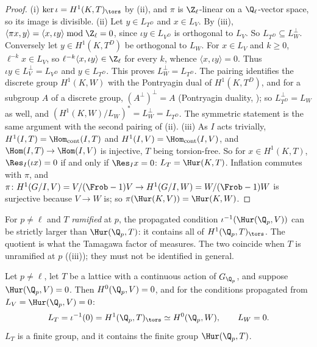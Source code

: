 \begin{proof}
(i) $\ker\iota=H^1(K,T)_{\tors}$ by (ii), and $\pi$ is $\Z_\ell$-linear on a $\Q_\ell$-vector space, so its image is divisible.
(ii) Let $y\in L_{T^D}$ and $x\in L_V$. By (iii), $\langle\pi x,y\rangle=\langle x,\iota y\rangle\bmod\Z_\ell=0$, since $\iota y\in L_{V^D}$ is orthogonal
to $L_V$. So $L_{T^D}\subseteq L_W^\perp$. Conversely let $y\in H^1(K,T^D)$ be orthogonal to $L_W$. For $x\in L_V$ and $k\ge0$, $\ell^{-k}x\in L_V$, so
$\ell^{-k}\langle x,\iota y\rangle\in\Z_\ell$ for every $k$, whence $\langle x,\iota y\rangle=0$. Thus $\iota y\in L_V^\perp=L_{V^D}$ and $y\in L_{T^D}$. This proves
$L_W^\perp=L_{T^D}$. The pairing identifies the discrete group $H^1(K,W)$ with the Pontryagin dual of $H^1(K,T^D)$, and for a subgroup $A$ of a discrete group,
$(A^\perp)^\perp=A$ (Pontryagin duality, ); so $L_{T^D}^\perp=L_W$ as well, and $(H^1(K,W)/L_W)^*=L_W^\perp=L_{T^D}$. The symmetric statement is the same
argument with the second pairing of (ii).
(iii) As $I$ acts trivially, $H^1(I,T)=\Hom_{\mathrm{cont}}(I,T)$ and $H^1(I,V)=\Hom_{\mathrm{cont}}(I,V)$, and $\Hom(I,T)\to\Hom(I,V)$ is injective, $T$ being torsion-free. So
for $x\in H^1(K,T)$, $\Res_I(\iota x)=0$ if and only if $\Res_Ix=0$: $L_T=\Hur(K,T)$. Inflation commutes with $\pi$, and $\pi\colon H^1(G/I,V)=V/(\Frob-1)V\to
H^1(G/I,W)=W/(\Frob-1)W$ is surjective because $V\to W$ is; so $\pi(\Hur(K,V))=\Hur(K,W)$.
\end{proof}

\begin{warning}
For $p\ne\ell$ and $T$ \emph{ramified} at $p$, the propagated condition $\iota^{-1}(\Hur(\Q_p,V))$ can be strictly larger than $\Hur(\Q_p,T)$: it contains all of
$H^1(\Q_p,T)_{\tors}$. The quotient is what the Tamagawa factor of  measures. The two coincide when $T$ is unramified at $p$
((iii)); they must not be identified in general.
\end{warning}

\begin{corollary}\label{cor:galcoh:ur-vanishing}
Let $p\ne\ell$, let $T$ be a lattice with a continuous action of $G_{\Q_p}$, and suppose $\Hur(\Q_p,V)=0$. Then $H^0(\Q_p,V)=0$, and for the conditions propagated from
$L_V=\Hur(\Q_p,V)=0$:
\[
L_T=\iota^{-1}(0)=H^1(\Q_p,T)_{\tors}\simeq H^0(\Q_p,W),\qquad L_W=0 .
\]
$L_T$ is a finite group, and it contains the finite group $\Hur(\Q_p,T)$.
\end{corollary}


